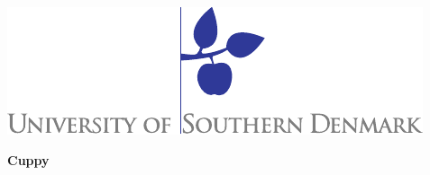 \begin{titlepage}%
\begin{flushright}
\includegraphics[scale=0.73]{content/00_frontmatter/sdu_logo.pdf}
\end{flushright}
\vspace*{2.0cm}
\setlength{\extrarowheight}{0pt}
\textsf{\Huge{\textbf{\textcolor{FrontpageHeadingColor}{Cuppy}}}}\\
\vspace*{0.5cm}

\end{titlepage}
